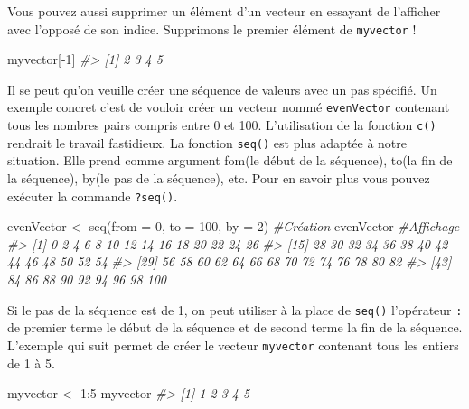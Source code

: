 \documentclass[
]{book}
\newenvironment{Shaded}{\begin{snugshade}}{\end{snugshade}}
\newcommand{\AttributeTok}[1]{\textcolor[rgb]{0.77,0.63,0.00}{#1}}
\newcommand{\CommentTok}[1]{\textcolor[rgb]{0.56,0.35,0.01}{\textit{#1}}}
\newcommand{\DecValTok}[1]{\textcolor[rgb]{0.00,0.00,0.81}{#1}}
\newcommand{\FunctionTok}[1]{\textcolor[rgb]{0.00,0.00,0.00}{#1}}
\newcommand{\NormalTok}[1]{#1}
\newcommand{\OtherTok}[1]{\textcolor[rgb]{0.56,0.35,0.01}{#1}}
\newcommand{\SpecialCharTok}[1]{\textcolor[rgb]{0.00,0.00,0.00}{#1}}
\theoremstyle{definition}
\theoremstyle{definition}
\theoremstyle{definition}
\theoremstyle{definition}
\theoremstyle{remark}
\begin{document}
Vous pouvez aussi supprimer un élément d'un vecteur en essayant de l'afficher avec l'opposé de son indice. Supprimons le premier élément de \texttt{myvector} !

\begin{Shaded}
\begin{Highlighting}[]
\NormalTok{myvector[}\SpecialCharTok{{-}}\DecValTok{1}\NormalTok{]}
\CommentTok{\#\textgreater{} [1] 2 3 4 5}
\end{Highlighting}
\end{Shaded}

Il se peut qu'on veuille créer une séquence de valeurs avec un pas spécifié. Un exemple concret c'est de vouloir créer un vecteur nommé \texttt{evenVector} contenant tous les nombres pairs compris entre 0 et 100. L'utilisation de la fonction \texttt{c()} rendrait le travail fastidieux. La fonction \texttt{seq()} est plus adaptée à notre situation. Elle prend comme argument fom(le début de la séquence), to(la fin de la séquence), by(le pas de la séquence), etc. Pour en savoir plus vous pouvez exécuter la commande \texttt{?seq()}.

\begin{Shaded}
\begin{Highlighting}[]
\NormalTok{evenVector }\OtherTok{\textless{}{-}} \FunctionTok{seq}\NormalTok{(}\AttributeTok{from =} \DecValTok{0}\NormalTok{, }\AttributeTok{to =} \DecValTok{100}\NormalTok{, }\AttributeTok{by =} \DecValTok{2}\NormalTok{) }\CommentTok{\#Création }
\NormalTok{evenVector }\CommentTok{\#Affichage}
\CommentTok{\#\textgreater{}  [1]   0   2   4   6   8  10  12  14  16  18  20  22  24  26}
\CommentTok{\#\textgreater{} [15]  28  30  32  34  36  38  40  42  44  46  48  50  52  54}
\CommentTok{\#\textgreater{} [29]  56  58  60  62  64  66  68  70  72  74  76  78  80  82}
\CommentTok{\#\textgreater{} [43]  84  86  88  90  92  94  96  98 100}
\end{Highlighting}
\end{Shaded}

Si le pas de la séquence est de 1, on peut utiliser à la place de \texttt{seq()} l'opérateur \texttt{:} de premier terme le début de la séquence et de second terme la fin de la séquence. L'exemple qui suit permet de créer le vecteur \texttt{myvector} contenant tous les entiers de 1 à 5.

\begin{Shaded}
\begin{Highlighting}[]
\NormalTok{myvector }\OtherTok{\textless{}{-}} \DecValTok{1}\SpecialCharTok{:}\DecValTok{5}
\NormalTok{myvector}
\CommentTok{\#\textgreater{} [1] 1 2 3 4 5}
\end{Highlighting}
\end{Shaded}
\end{document}
